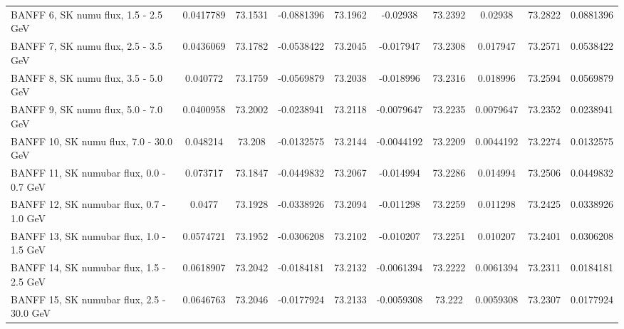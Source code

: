\begin{tabular}{| l | S | S  S | S  S | S  S | S  S | }
                                           BANFF  6, SK numu flux, 1.5 - 2.5 GeV &       0.0417789 &         73.1531 &      -0.0881396 &         73.1962 &        -0.02938 &         73.2392 &         0.02938 &         73.2822 &       0.0881396 \\ 
                                           BANFF  7, SK numu flux, 2.5 - 3.5 GeV &       0.0436069 &         73.1782 &      -0.0538422 &         73.2045 &       -0.017947 &         73.2308 &        0.017947 &         73.2571 &       0.0538422 \\ 
                                           BANFF  8, SK numu flux, 3.5 - 5.0 GeV &        0.040772 &         73.1759 &      -0.0569879 &         73.2038 &       -0.018996 &         73.2316 &        0.018996 &         73.2594 &       0.0569879 \\ 
                                           BANFF  9, SK numu flux, 5.0 - 7.0 GeV &       0.0400958 &         73.2002 &      -0.0238941 &         73.2118 &      -0.0079647 &         73.2235 &       0.0079647 &         73.2352 &       0.0238941 \\ 
                                          BANFF 10, SK numu flux, 7.0 - 30.0 GeV &        0.048214 &          73.208 &      -0.0132575 &         73.2144 &      -0.0044192 &         73.2209 &       0.0044192 &         73.2274 &       0.0132575 \\ 
                                        BANFF 11, SK numubar flux, 0.0 - 0.7 GeV &        0.073717 &         73.1847 &      -0.0449832 &         73.2067 &       -0.014994 &         73.2286 &        0.014994 &         73.2506 &       0.0449832 \\ 
                                        BANFF 12, SK numubar flux, 0.7 - 1.0 GeV &          0.0477 &         73.1928 &      -0.0338926 &         73.2094 &       -0.011298 &         73.2259 &        0.011298 &         73.2425 &       0.0338926 \\ 
                                        BANFF 13, SK numubar flux, 1.0 - 1.5 GeV &       0.0574721 &         73.1952 &      -0.0306208 &         73.2102 &       -0.010207 &         73.2251 &        0.010207 &         73.2401 &       0.0306208 \\ 
                                        BANFF 14, SK numubar flux, 1.5 - 2.5 GeV &       0.0618907 &         73.2042 &      -0.0184181 &         73.2132 &      -0.0061394 &         73.2222 &       0.0061394 &         73.2311 &       0.0184181 \\ 
                                       BANFF 15, SK numubar flux, 2.5 - 30.0 GeV &       0.0646763 &         73.2046 &      -0.0177924 &         73.2133 &      -0.0059308 &          73.222 &       0.0059308 &         73.2307 &       0.0177924 \\ 

\end{tabular}
